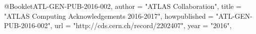 
@Booklet{ATL-GEN-PUB-2016-002,
          author         = "{ATLAS Collaboration}",
          title          = "{ATLAS Computing Acknowledgements
      2016-2017}",
          howpublished   = "{ATL-GEN-PUB-2016-002}",
          url            = "http://cds.cern.ch/record/2202407",
          year           = "2016",
      } 

